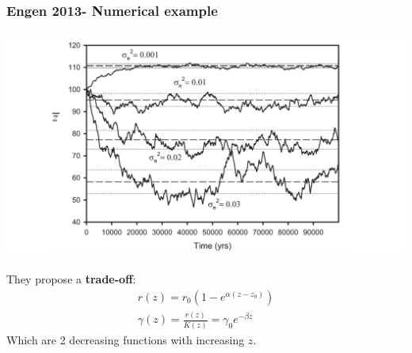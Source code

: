 \documentclass{beamer}
\begin{document}
\begin{frame}
\frametitle{Engen 2013- Numerical example}
\begin{minipage}{0.45\textwidth}
\includegraphics[width=1.2\columnwidth]{Engen.pdf}
\end{minipage}%
\hfill
\begin{minipage}{0.45\textwidth}
They propose a \textbf{trade-off}:
\begin{equation*}
\begin{aligned}
r(z)=r_0(1-e^{\alpha(z-z_0)}) \\
\gamma(z)= \frac{r(z)}{K(z)} =\gamma_0 e^{-\beta z}
\end{aligned}
\end{equation*}
Which are 2 decreasing functions with increasing $z$.
\end{minipage}%
\end{frame}
\end{document}
